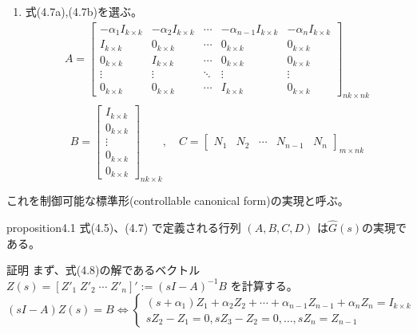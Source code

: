 \documentclass{jsarticle}
\begin{document}
\begin{enumerate}
  \item 式(4.7a),(4.7b)を選ぶ。
  \begin{equation}
    \begin{array}{l}
    A=\left[\begin{array}{ccccc}
    -\alpha_{1} I_{k \times k} & -\alpha_{2} I_{k \times k} & \cdots & -\alpha_{n-1} I_{k \times k} & -\alpha_{n} I_{k \times k} \\
    I_{k \times k} & 0_{k \times k} & \cdots & 0_{k \times k} & 0_{k \times k} \\
    0_{k \times k} & I_{k \times k} & \cdots & 0_{k \times k} & 0_{k \times k} \\
    \vdots & \vdots & \ddots & \vdots & \vdots \\
    0_{k \times k} & 0_{k \times k} & \cdots & I_{k \times k} & 0_{k \times k}
    \end{array}\right]_{n k \times n k}\\
  \end{array}\tag{4.7a}
  \end{equation}
    \begin{equation}
    B=\left[\begin{array}{c}
    I_{k \times k} \\
    0_{k \times k} \\
    \vdots \\
    0_{k \times k} \\
    0_{k \times k}
    \end{array}\right]_{n k \times k}, \quad C=\left[\begin{array}{lllll}
    N_{1} & N_{2} & \cdots & N_{n-1} & N_{n}
    \end{array}\right]_{m \times n k}\tag{4.7b}
  \end{equation}

\end{enumerate}
これを制御可能な標準形(controllable canonical form)の実現と呼ぶ。
\newpage
\begin{itembox}[l]{proposition4.1}
  式(4.5)、(4.7) で定義される行列 $( A , B , C , D )$ は$\hat{G}( s )$の実現である。
\end{itembox}
証明\;\;
まず、式(4.8)の解であるベクトル
$Z(s) = \left[ Z'_1\;Z'_2\;\cdots\;Z'_n \right]' := (sI-A)^{-1}B$
を計算する。
\begin{equation}
  (s I-A) Z(s)=B \Leftrightarrow\left\{\begin{array}{l}
  \left(s+\alpha_{1}\right) Z_{1}+\alpha_{2} Z_{2}+\cdots+\alpha_{n-1} Z_{n-1}+\alpha_{n} Z_{n}=I_{k \times k} \\
  s Z_{2}-Z_{1}=0, s Z_{3}-Z_{2}=0, \ldots, s Z_{n}=Z_{n-1}
  \end{array}\right.\tag{4.8}
\end{equation}
\end{document}
